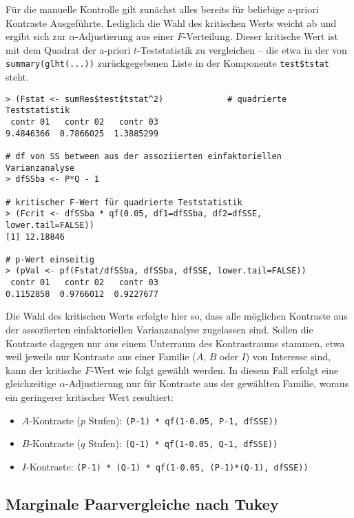 Für die manuelle Kontrolle gilt zunächst alles bereits für beliebige a-priori Kontraste Ausgeführte. Lediglich die Wahl des kritischen Werts weicht ab und ergibt sich zur $\alpha$-Adjustierung aus einer $F$-Verteilung. Dieser kritische Wert ist mit dem Quadrat der a-priori $t$-Teststatistik zu vergleichen -- die etwa in der von \lstinline!summary(glht(...))! zurückgegebenen Liste in der Komponente \lstinline!test$tstat! steht.
\begin{lstlisting}
> (Fstat <- sumRes$test$tstat^2)             # quadrierte Teststatistik
 contr 01   contr 02   contr 03
9.4846366  0.7866025  1.3885299

# df von SS between aus der assoziierten einfaktoriellen Varianzanalyse
> dfSSba <- P*Q - 1

# kritischer F-Wert für quadrierte Teststatistik
> (Fcrit <- dfSSba * qf(0.05, df1=dfSSba, df2=dfSSE, lower.tail=FALSE))
[1] 12.18846

# p-Wert einseitig
> (pVal <- pf(Fstat/dfSSba, dfSSba, dfSSE, lower.tail=FALSE))
 contr 01   contr 02   contr 03
0.1152858  0.9766012  0.9227677
\end{lstlisting}

Die Wahl des kritischen Werts erfolgte hier so, dass alle möglichen Kontraste aus der assoziierten einfaktoriellen Varianzanalyse zugelassen sind. Sollen die Kontraste dagegen nur aus einem Unterraum des Kontrastraums stammen, etwa weil jeweils nur Kontraste aus einer Familie ($A$, $B$ oder $I$) von Interesse sind, kann der kritische $F$-Wert wie folgt gewählt werden. In diesem Fall erfolgt eine gleichzeitige $\alpha$-Adjustierung nur für Kontraste aus der gewählten Familie, woraus ein geringerer kritischer Wert resultiert:
\begin{itemize}
\item $A$-Kontraste ($p$ Stufen): \lstinline!(P-1) * qf(1-0.05, P-1, dfSSE))!
\item $B$-Kontraste ($q$ Stufen): \lstinline!(Q-1) * qf(1-0.05, Q-1, dfSSE))!
\item $I$-Kontraste: \lstinline!(P-1) * (Q-1) * qf(1-0.05, (P-1)*(Q-1), dfSSE))!
\end{itemize}

\subsection{Marginale Paarvergleiche nach Tukey}

